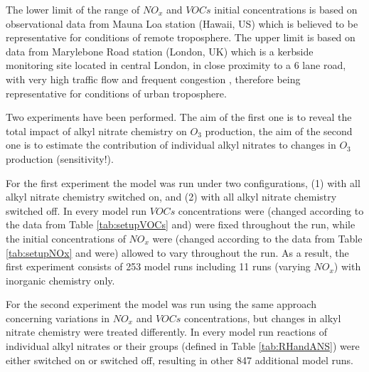 \documentclass[11pt,a4paper]{article}
\begin{document}
The lower limit of the range of $NO_x$ and $VOCs$ initial concentrations is based on observational data from Mauna Loa station (Hawaii, US) which is believed to be representative for conditions of remote troposphere. The upper limit is based on data from 
Marylebone Road station (London, UK) which is a kerbside monitoring site located in central London, in close proximity to a 6 lane road, with very high traffic flow and frequent congestion \citep{VonSchneidemesser2010}, therefore being representative for conditions of urban troposphere.

Two experiments have been performed. The aim of the first one is to reveal the total impact of alkyl nitrate chemistry on $O_3$ production, the aim of the second one is to estimate the contribution of individual alkyl nitrates to changes in $O_3$ production (sensitivity!).

For the first experiment the model was run under two configurations, (1) with all alkyl nitrate chemistry switched on, and (2) with all alkyl nitrate chemistry switched off. In every model run $VOCs$ concentrations were (changed according to the data from Table \ref{tab:setupVOCs} and) were fixed throughout the run, while the initial concentrations of $NO_x$ were (changed according to the data from Table \ref{tab:setupNOx} and were) allowed to vary throughout the run. As a result, the first experiment consists of 253 model runs including 11 runs (varying $NO_x$) with inorganic chemistry only.

For the second experiment the model was run using the same approach concerning variations in $NO_x$ and $VOCs$ concentrations, but changes in alkyl nitrate chemistry were treated differently. In every model run reactions of individual alkyl nitrates or their groups (defined in Table \ref{tab:RHandANS}) were either switched on or switched off, resulting in other 847 additional model runs.
\end{document}
